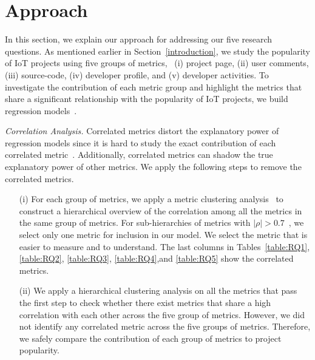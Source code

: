 \section{Approach}\label{section:approach}

In this section, we explain our approach for addressing our five research
questions.  As mentioned earlier in Section~\ref{introduction}, we study the
popularity of IoT projects using five groups of metrics, \ie~(i) project page,
(ii) user comments, (iii) source-code, (iv) developer profile, and (v)
developer activities.  To investigate the contribution of each metric group and
highlight the metrics that share a significant relationship with the popularity
of IoT projects, we build regression models~\cite{weisberg2005applied,lrm}.

\vspace{0.1cm}

\noindent\textit{Correlation Analysis.} Correlated metrics distort the
explanatory power of regression models since it is hard to study the exact
contribution of each correlated metric~\cite{harrell2001rms}.  Additionally,
correlated metrics can shadow the true explanatory power of other metrics.  We
apply the following steps to remove the correlated metrics.

\begin{enumerate}
	\item[(i)] For each group of metrics, we apply a metric clustering
		analysis~\cite{sarle1990varclus} to construct a hierarchical
		overview of the correlation among all the metrics in the same
		group of metrics.  For sub-hierarchies of metrics with
		$|\rho|>0.7$~\cite{nguyen2010studying}, we select only one
		metric for inclusion in our model. We select the metric that is
		easier to measure and to understand. The last columns in
		Tables~\ref{table:RQ1}, \ref{table:RQ2}, \ref{table:RQ3},
		\ref{table:RQ4},and \ref{table:RQ5} show the correlated
		metrics.
	
	\item[(ii)] We apply a hierarchical clustering analysis on all the
		metrics that pass the first step to check whether there exist
		metrics that share a high correlation with each other across
		the five group of metrics. However, we did not identify any
		correlated metric across the five groups of metrics. Therefore,
		we safely compare the contribution of each group of metrics to
		project popularity.
\end{enumerate}

\vspace{0.1cm}

